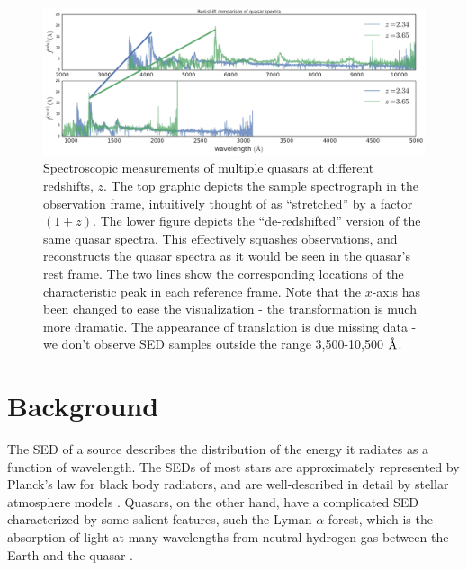 \documentclass{article} %
\begin{document}
\begin{figure}[ht]
\vskip 0in
\begin{center}
\centerline{\includegraphics[width=\figwidth]{../figs/quasar_redshift_example}}
\vskip -0.18in
\caption{%
Spectroscopic measurements of multiple quasars at different redshifts, $z$.
The top graphic depicts the sample spectrograph in the observation frame, intuitively thought of as ``stretched'' by a factor $(1+z)$.
The lower figure depicts the ``de-redshifted'' version of the same quasar spectra.
This effectively squashes observations, and reconstructs the quasar spectra as it would be seen in the quasar's rest frame.  
The two lines show the corresponding locations of the characteristic peak in each reference frame.  
Note that the $x$-axis has been changed to ease the visualization - the transformation is much more dramatic.  The appearance of translation is due missing data - we don't observe SED samples outside the range 3,500-10,500 $\textup{\AA}$.   
}
\label{fig:frames}
\end{center}
\vskip -0.28in
\end{figure} 


\section{Background}
\label{sec:background}
The SED of a source describes the distribution of the energy it radiates as a function of wavelength.  
The SEDs of most stars are approximately represented by Planck’s law for black body radiators, and are well-described in detail by stellar atmosphere models \cite{gray2001physical}.  
Quasars, on the other hand, have a complicated SED characterized by some salient features, such the Lyman-$\alpha$ forest, which is the absorption of light at many wavelengths from neutral hydrogen gas between the Earth and the quasar \cite{weinberg2003lymanalpha}.
\end{document}
